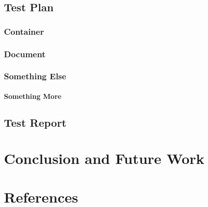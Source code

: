 \documentclass{vitmsprojectreport}
\begin{document}
\section{Test Plan}

\subsection{Container}

\subsection{Document}

\subsection{Something Else}

\subsubsection{Something More}

\section{Test Report}

\chapter{Conclusion and Future Work}

\chapter{References}
\end{document}
